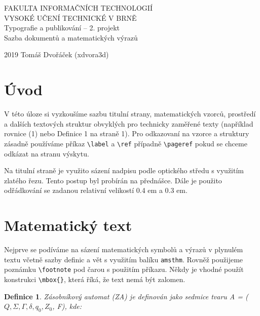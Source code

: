 \documentclass[twocolumn,a4paper,11pt]{article}
\newtheorem{definice}{Definice}
\begin{document}
\begin{titlepage}

\begin{center}
\renewcommand{\baselinestretch}{1.5}\normalsize
{\Huge {FAKULTA INFORMAČNÍCH TECHNOLOGIÍ \\ VYSOKÉ UČENÍ TECHNICKÉ V BRNĚ}}\\
{\LARGE Typografie a publikování – 2. projekt \\ Sazba dokumentů a matematických výrazů}
\\
\end{center}

{\LARGE 2019 \hfill Tomáš Dvořáček (xdvora3d)}


\end{titlepage}


\section*{Úvod}
V této úloze si vyzkoušíme sazbu titulní strany, matematických vzorců, prostředí a dalších textových struktur obvyklých pro technicky zaměřené texty (například rovnice (1) nebo Definice 1 na straně 1). Pro odkazovaní na vzorce a struktury zásadně používáme příkaz \verb|\label| a \verb|\ref| případně \verb|\pageref| pokud se chceme odkázat na stranu výskytu.
\par Na titulní straně je využito sázení nadpisu podle optického středu s využitím zlatého řezu. Tento postup byl probírán na přednášce. Dále je použito odřádkování se zadanou relativní velikostí 0.4 em a 0.3 em.

\section{Matematický text}
Nejprve se podíváme na sázení matematických symbolů a výrazů v plynulém textu včetně sazby definic a vět s využitím balíku \verb|amsthm|. Rovněž použijeme poznámku \verb|\footnote| pod čarou s použitím příkazu. Někdy je vhodné použít konstrukci \verb|\mbox{}|, která říká, že text nemá být zalomen.

\begin{definice}
Zásobníkový automat (ZA) je definován jako sedmice tvaru A = (\(Q, \Sigma, \Gamma, \delta, q_0, Z_0\), F), kde:
\end{definice}
\end{document}
